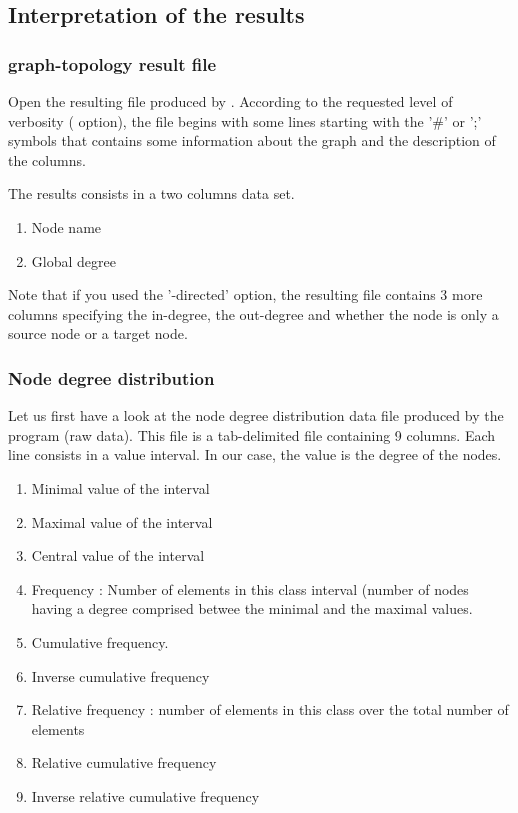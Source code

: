 \subsection{Interpretation of the results}

\subsubsection{graph-topology result file}
Open the resulting file produced by . 
According to the requested level of verbosity ( option), the file begins with some lines starting with the '\#' or ';' symbols that contains some information about the graph and the description of the columns.

The results consists in a two columns data set.
\begin{enumerate}
 \item Node name
 \item Global degree
\end{enumerate}

Note that if you used the '-directed' option, the resulting file contains 3 more columns specifying the in-degree, the out-degree and whether the node is only a source node or a target node.

\subsubsection{Node degree distribution}
Let us first have a look at the node degree distribution data file produced by the  program (raw data). 
This file is a tab-delimited file containing 9 columns. Each line consists in a value interval. In our case,
the value is the degree of the nodes. 

\begin{enumerate}
 \item Minimal value of the interval
 \item Maximal value of the interval
 \item Central value of the interval
 \item Frequency : Number of elements in this class interval (number of nodes having a degree comprised betwee the minimal and the maximal values.
 \item Cumulative frequency.
 \item Inverse cumulative frequency
 \item Relative frequency : number of elements in this class over the total number of elements
 \item Relative cumulative frequency
 \item Inverse relative cumulative frequency
\end{enumerate}

